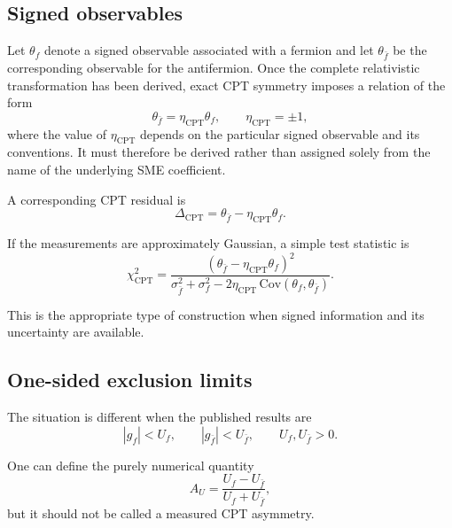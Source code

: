 \documentclass[aps,prd,reprint,superscriptaddress,nofootinbib]{revtex4-2}
\newcommand{\CPT}{\mathrm{CPT}}
\begin{document}
	\subsection{Signed observables}
	
	Let $\theta_f$ denote a signed observable associated with a fermion and
	let $\theta_{\bar f}$ be the corresponding observable for the
	antifermion. Once the complete relativistic transformation has been
	derived, exact CPT symmetry imposes a relation of the form
	\begin{equation}
		\theta_{\bar f}
		=
		\eta_\CPT\theta_f,
		\qquad
		\eta_\CPT=\pm1,
		\label{eq:CPTsigned}
	\end{equation}
	where the value of $\eta_\CPT$ depends on the particular signed
	observable and its conventions. It must therefore be derived rather
	than assigned solely from the name of the underlying SME coefficient.
	
	A corresponding CPT residual is
	\begin{equation}
		\Delta_\CPT
		=
		\theta_{\bar f}-\eta_\CPT\theta_f .
		\label{eq:DeltaCPT}
	\end{equation}
	
	If the measurements are approximately Gaussian, a simple test statistic
	is
	\begin{equation}
		\chi^2_\CPT
		=
		\frac{
			\left(
			\theta_{\bar f}-\eta_\CPT\theta_f
			\right)^2
		}{
			\sigma_{\bar f}^2+\sigma_f^2
			-2\eta_\CPT\,\mathrm{Cov}(\theta_f,\theta_{\bar f})
		}.
		\label{eq:chiCPT}
	\end{equation}
	
	This is the appropriate type of construction when signed information
	and its uncertainty are available.
	
	\subsection{One-sided exclusion limits}
	
	The situation is different when the published results are
	\begin{equation}
		|g_f|<U_f,
		\qquad
		|g_{\bar f}|<U_{\bar f},
		\qquad
		U_f,U_{\bar f}>0 .
		\label{eq:limits}
	\end{equation}
	
	One can define the purely numerical quantity
	\begin{equation}
		A_U
		=
		\frac{U_f-U_{\bar f}}
		{U_f+U_{\bar f}},
		\label{eq:AU}
	\end{equation}
	but it should not be called a measured CPT asymmetry.
	
\end{document}

